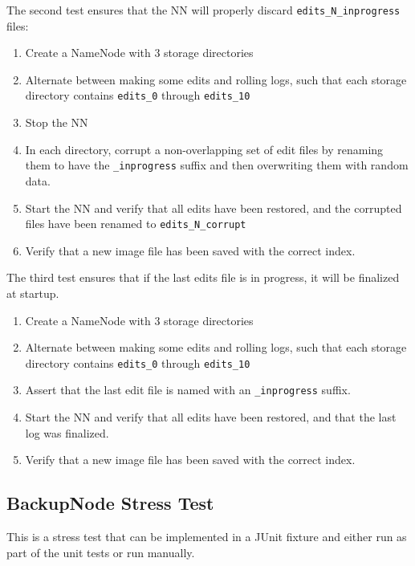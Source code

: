 \documentclass{article}
\begin{document}
The second test ensures that the NN will properly discard {\tt edits\_N\_inprogress} files:

\begin{enumerate}
\item Create a NameNode with 3 storage directories
\item Alternate between making some edits and rolling logs, such that each storage directory contains {\tt edits\_0} through {\tt edits\_10}
\item Stop the NN
\item In each directory, corrupt a non-overlapping set of edit files by renaming them to have the {\tt \_inprogress} suffix and then overwriting them with random data.
\item Start the NN and verify that all edits have been restored, and the corrupted files have been renamed to {\tt edits\_N\_corrupt}
\item Verify that a new image file has been saved with the correct index.
\end{enumerate}

The third test ensures that if the last edits file is in progress, it will be finalized at startup.

\begin{enumerate}
\item Create a NameNode with 3 storage directories
\item Alternate between making some edits and rolling logs, such that each storage directory contains {\tt edits\_0} through {\tt edits\_10}
\item Assert that the last edit file is named with an {\tt \_inprogress} suffix.
\item Start the NN and verify that all edits have been restored, and that the last log was finalized.
\item Verify that a new image file has been saved with the correct index.
\end{enumerate}

\subsection{BackupNode Stress Test}

This is a stress test that can be implemented in a JUnit fixture and either run as part of the unit tests or run manually.
\end{document}
